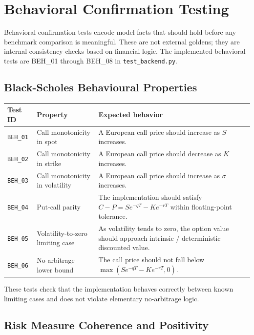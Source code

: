 \documentclass[11pt]{article}
\newcommand{\code}[1]{\texttt{#1}}
\begin{document}
\section{Behavioral Confirmation Testing}
\label{sec:behavioral-confirmation}

Behavioral confirmation tests encode model facts that should hold before
any benchmark comparison is meaningful.  These are not external goldens;
they are internal consistency checks based on financial logic.  The
implemented behavioral tests are BEH\_01 through BEH\_08 in
\code{test\_backend.py}.

\subsection{Black-Scholes Behavioural Properties}

\begin{center}
\begin{tabular}{L{2.2cm}L{4.8cm}L{6cm}}
\toprule
\textbf{Test ID} & \textbf{Property} & \textbf{Expected behavior} \\
\midrule
\code{BEH\_01} & Call monotonicity in spot & A European call price should increase as $S$ increases. \\
\code{BEH\_02} & Call monotonicity in strike & A European call price should decrease as $K$ increases. \\
\code{BEH\_03} & Call monotonicity in volatility & A European call price should increase as $\sigma$ increases. \\
\code{BEH\_04} & Put-call parity & The implementation should satisfy
$C - P = S e^{-qT} - K e^{-rT}$ within floating-point tolerance. \\
\code{BEH\_05} & Volatility-to-zero limiting case & As volatility tends to zero, the option value should approach intrinsic / deterministic discounted value. \\
\code{BEH\_06} & No-arbitrage lower bound & The call price should not fall below $\max(S e^{-qT} - K e^{-rT}, 0)$. \\
\bottomrule
\end{tabular}
\end{center}

These tests check that the implementation behaves correctly between
known limiting cases and does not violate elementary no-arbitrage logic.

\subsection{Risk Measure Coherence and Positivity}
\end{document}
